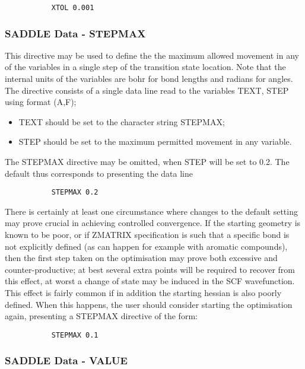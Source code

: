 \documentclass[11pt,fleqn]{article}
\begin{document}
{
\footnotesize
\begin{verbatim}
           XTOL 0.001
\end{verbatim}
}

\subsubsection[SADDLE Data - STEPMAX]{SADDLE Data - STEPMAX}

This directive may be used to define the 
the maximum allowed movement in any of the variables
in a single step of the transition state location. Note that 
the internal units of the variables are
bohr for bond lengths and radians for angles. 
The directive consists of a single data line
read to the variables TEXT, STEP using format (A,F);
\begin{itemize}
\item TEXT should be set to the character string STEPMAX;
\item STEP should be set to the maximum permitted movement
in any variable.
\end{itemize}
The STEPMAX directive may be omitted, when STEP will be set to 0.2.
The default thus corresponds to presenting the data line

{
\footnotesize
\begin{verbatim}
           STEPMAX 0.2
\end{verbatim}
}
There is certainly at least one circumstance where changes to
the default setting may prove crucial in achieving controlled
convergence. If the starting geometry is known to be poor, or
if ZMATRIX specification is such that a specific bond is not
explicitly defined (as can happen for example with aromatic
compounds), then the first step taken on the optimisation
may prove both excessive and counter-productive; at best several 
extra points
will be required to recover from this effect, at worst
a change of state may be induced in the SCF wavefunction. This effect
is fairly common if in addition the starting hessian is also poorly
defined. When this happens, the user should consider starting
the optimisation again, presenting a STEPMAX directive of the 
form:

{
\footnotesize
\begin{verbatim}
           STEPMAX 0.1
\end{verbatim}
}

\subsubsection[SADDLE Data - VALUE]{SADDLE Data - VALUE}
\end{document}
